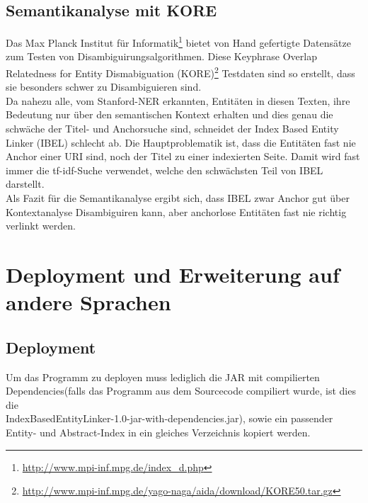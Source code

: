 \documentclass[11pt, a4paper, oneside]{Thesis} %
\begin{document}
\section{Semantikanalyse mit KORE}
Das Max Planck Institut f\"ur Informatik\footnote{\url{http://www.mpi-inf.mpg.de/index\_d.php}} bietet von Hand gefertigte Datens\"atze zum Testen von Disambiguirungsalgorithmen. Diese Keyphrase Overlap Relatedness for Entity Dismabiguation (KORE)\footnote{\url{http://www.mpi-inf.mpg.de/yago-naga/aida/download/KORE50.tar.gz}} Testdaten sind so erstellt, dass sie besonders schwer zu Disambiguieren sind. \\
Da nahezu alle, vom Stanford-NER erkannten, Entit\"aten in diesen Texten, ihre Bedeutung nur \"uber den semantischen Kontext erhalten und dies genau die schw\"ache der Titel- und Anchorsuche sind, schneidet der Index Based Entity Linker (IBEL) schlecht ab.  Die Hauptproblematik ist, dass die Entit\"aten fast nie Anchor einer URI sind, noch der Titel zu einer indexierten Seite. Damit wird fast immer die tf-idf-Suche verwendet, welche den schw\"achsten Teil von IBEL darstellt.\\
Als Fazit f\"ur die Semantikanalyse ergibt sich, dass IBEL zwar Anchor gut \"uber Kontextanalyse Disambiguiren kann, aber anchorlose Entit\"aten fast nie  
richtig verlinkt werden.

\chapter{Deployment und Erweiterung auf andere Sprachen}
\label{Kapitel 5} %

\section{Deployment}
Um das Programm zu deployen muss lediglich die JAR mit compilierten Dependencies(falls das Programm aus dem Sourcecode compiliert wurde, ist dies die \\\grqq IndexBasedEntityLinker-1.0-jar-with-dependencies.jar\grqq), sowie ein passender Entity- und Abstract-Index in ein gleiches Verzeichnis kopiert werden.
\end{document}
